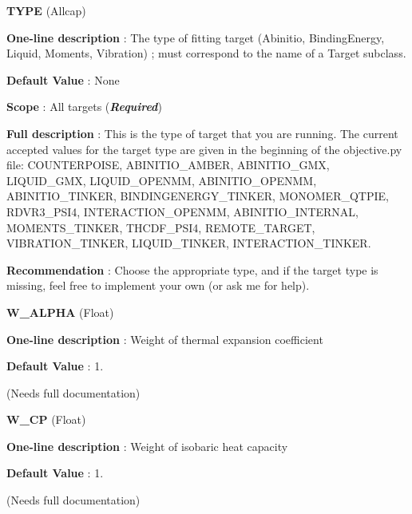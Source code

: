 \begin{DoxyItemize}
\item {\bfseries  T\-Y\-P\-E } (Allcap) \par
{\bfseries  One-\/line description }\-: The type of fitting target (Abinitio, Binding\-Energy, Liquid, Moments, Vibration) ; must correspond to the name of a Target subclass. \par
{\bfseries  Default Value }\-: None \par
{\bfseries  Scope }\-: All targets ({\bfseries {\itshape Required}}) \par
{\bfseries  Full description }\-: This is the type of target that you are running. The current accepted values for the target type are given in the beginning of the objective.\-py file\-: C\-O\-U\-N\-T\-E\-R\-P\-O\-I\-S\-E, A\-B\-I\-N\-I\-T\-I\-O\-\_\-\-A\-M\-B\-E\-R, A\-B\-I\-N\-I\-T\-I\-O\-\_\-\-G\-M\-X, L\-I\-Q\-U\-I\-D\-\_\-\-G\-M\-X, L\-I\-Q\-U\-I\-D\-\_\-\-O\-P\-E\-N\-M\-M, A\-B\-I\-N\-I\-T\-I\-O\-\_\-\-O\-P\-E\-N\-M\-M, A\-B\-I\-N\-I\-T\-I\-O\-\_\-\-T\-I\-N\-K\-E\-R, B\-I\-N\-D\-I\-N\-G\-E\-N\-E\-R\-G\-Y\-\_\-\-T\-I\-N\-K\-E\-R, M\-O\-N\-O\-M\-E\-R\-\_\-\-Q\-T\-P\-I\-E, R\-D\-V\-R3\-\_\-\-P\-S\-I4, I\-N\-T\-E\-R\-A\-C\-T\-I\-O\-N\-\_\-\-O\-P\-E\-N\-M\-M, A\-B\-I\-N\-I\-T\-I\-O\-\_\-\-I\-N\-T\-E\-R\-N\-A\-L, M\-O\-M\-E\-N\-T\-S\-\_\-\-T\-I\-N\-K\-E\-R, T\-H\-C\-D\-F\-\_\-\-P\-S\-I4, R\-E\-M\-O\-T\-E\-\_\-\-T\-A\-R\-G\-E\-T, V\-I\-B\-R\-A\-T\-I\-O\-N\-\_\-\-T\-I\-N\-K\-E\-R, L\-I\-Q\-U\-I\-D\-\_\-\-T\-I\-N\-K\-E\-R, I\-N\-T\-E\-R\-A\-C\-T\-I\-O\-N\-\_\-\-T\-I\-N\-K\-E\-R. \par
{\bfseries  Recommendation }\-: Choose the appropriate type, and if the target type is missing, feel free to implement your own (or ask me for help).\end{DoxyItemize}
\begin{DoxyItemize}
\item {\bfseries  W\-\_\-\-A\-L\-P\-H\-A } (Float) \par
{\bfseries  One-\/line description }\-: Weight of thermal expansion coefficient \par
{\bfseries  Default Value }\-: 1. \par
(Needs full documentation)\end{DoxyItemize}
\begin{DoxyItemize}
\item {\bfseries  W\-\_\-\-C\-P } (Float) \par
{\bfseries  One-\/line description }\-: Weight of isobaric heat capacity \par
{\bfseries  Default Value }\-: 1. \par
(Needs full documentation)\end{DoxyItemize}
